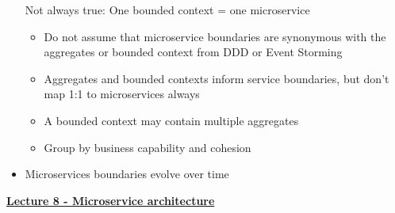 \documentclass[landscape,a4paper]{extarticle}
\begin{document}
\begin{multicols*}{5}
\begin{itemize}
         Not always true: One bounded context = one microservice
        \begin{itemize}
            \item Do not assume that microservice boundaries are synonymous with the aggregates
            or bounded context from DDD or Event Storming
            \item Aggregates and bounded contexts inform service boundaries, but don't
            map 1:1 to microservices always
            \item A bounded context may contain multiple aggregates
            \item Group by business capability and cohesion
        \end{itemize}
        \item Microservices boundaries evolve over time
    \end{itemize}

    \textbf{\uline{Lecture 8 - Microservice architecture}}

\end{multicols*}
\end{document}
